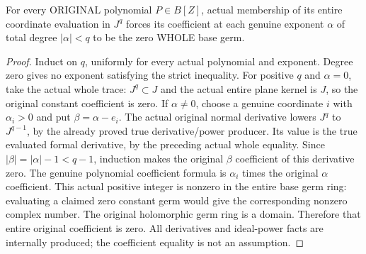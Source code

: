 \begin{lemma}
\label{hir:relative-normal-basis-actual-coefficient-separation}
\leanok
For every ORIGINAL polynomial $P\in B[Z]$, actual membership of its entire
coordinate evaluation in $J^q$ forces its coefficient at each genuine exponent
$\alpha$ of total degree $|\alpha|<q$ to be the zero WHOLE base germ.
\end{lemma}
\begin{proof}
Induct on $q$, uniformly for every actual polynomial and exponent. Degree
zero gives no exponent satisfying the strict inequality. For positive $q$
and $\alpha=0$, take the actual whole trace: $J^q\subset J$ and the actual
entire plane kernel is $J$, so the original constant coefficient is zero.
If $\alpha\ne0$, choose a genuine coordinate $i$ with $\alpha_i>0$ and put
$\beta=\alpha-e_i$. The actual original normal derivative lowers $J^q$ to
$J^{q-1}$, by the already proved true derivative/power producer. Its value is
the true evaluated formal derivative, by the preceding actual whole equality.
Since $|\beta|=|\alpha|-1<q-1$, induction makes the original $\beta$ coefficient
of this derivative zero. The genuine polynomial coefficient formula is
$\alpha_i$ times the original $\alpha$ coefficient. This actual positive
integer is nonzero in the entire base germ ring: evaluating a claimed zero
constant germ would give the corresponding nonzero complex number. The
original holomorphic germ ring is a domain. Therefore that entire original
coefficient is zero. All derivatives and ideal-power facts are internally
produced; the coefficient equality is not an assumption.
\end{proof}

